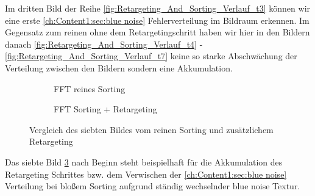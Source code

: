 Im dritten Bild der Reihe \ref{fig:Retargeting_And_Sorting_Verlauf_t3} können wir eine erste 
\ref{ch:Content1:sec:blue noise} Fehlerverteilung im Bildraum erkennen. Im Gegensatz zum 
reinen  ohne dem Retargetingschritt haben wir hier in den 
Bildern danach \ref{fig:Retargeting_And_Sorting_Verlauf_t4} - \ref{fig:Retargeting_And_Sorting_Verlauf_t7}
keine so starke Abschwächung der Verteilung zwischen den Bildern sondern eine Akkumulation.

\begin{figure}[H]
    \begin{subfigure}{0.5\textwidth}
        \caption{FFT reines Sorting}
        \label{fig:VergleichSorting}
    \end{subfigure}
    \begin{subfigure}{0.5\textwidth}
        \caption{FFT Sorting + Retargeting}
        \label{fig:VergleichRetargeting}
    \end{subfigure}
        \caption{Vergleich des siebten Bildes vom reinen Sorting und zusätzlichem Retargeting}
        \label{fig:VergleichBild7}
\end{figure}

Das siebte Bild \ref{fig:VergleichBild7} nach Beginn steht beispielhaft für die Akkumulation des Retargeting Schrittes bzw. 
dem Verwischen der \ref{ch:Content1:sec:blue noise} Verteilung bei bloßem Sorting aufgrund ständig 
wechselnder blue noise Textur.